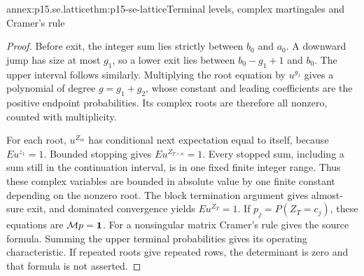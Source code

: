 \begin{annexitem}{annex:p15.se.lattice}{thm:p15-se-lattice}{Terminal levels, complex martingales and Cramer's rule}
\begin{proof}
Before exit, the integer sum lies strictly between \(b_0\) and
\(a_0\). A downward jump has size at most \(g_1\), so a lower
exit lies between \(b_0-g_1+1\) and \(b_0\). The upper interval
follows similarly. Multiplying the root equation by \(u^{g_1}\)
gives a polynomial of degree \(g=g_1+g_2\), whose constant and leading
coefficients are the positive endpoint probabilities. Its complex roots
are therefore all nonzero, counted with multiplicity.

For each root, \(u^{Z_m}\) has conditional next expectation equal
to itself, because \(Eu^{z_1}=1\). Bounded stopping gives
\(Eu^{Z_{T\wedge n}}=1\). Every stopped sum, including a sum still
in the continuation interval, is in one fixed finite integer range.
Thus these complex variables are bounded in absolute value by one finite
constant depending on the nonzero root. The block termination argument
gives almost-sure exit, and dominated convergence yields
\(Eu^{Z_T}=1\). If \(p_j=P(Z_T=c_j)\), these equations are
\(\mathcal M p={\bf1}\). For a nonsingular matrix Cramer's rule gives the
source formula. Summing the upper terminal probabilities gives its
operating characteristic. If repeated roots give repeated rows, the
determinant is zero and that formula is not asserted.
\end{proof}
\end{annexitem}

